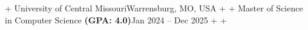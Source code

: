 \documentclass[letterpaper,10pt]{article}                                                                                                                                                                                                                                                                                                                                                                                                                                                                                                                                                                         +
\begin{document}
                                                                                                                                                                                                                                                                                                                                                                                                                                                                                                                                                                                                                   +
     {University of Central Missouri}{Warrensburg, MO, USA}                                                                                                                                                                                                                                                                                                                                                                                                                                                                                                                                                        +
                                                                                                                                                                                                                                                                                                                                                                                                                                                                                                                                                                                                                   +
     {Master of Science in Computer Science \textbf{(GPA: 4.0)}}{Jan 2024 -- Dec 2025}                                                                                                                                                                                                                                                                                                                                                                                                                                                                                                                             +
                                                                                                                                                                                                                                                                                                                                                                                                                                                                                                                                                                                                                   +
\end{document}
